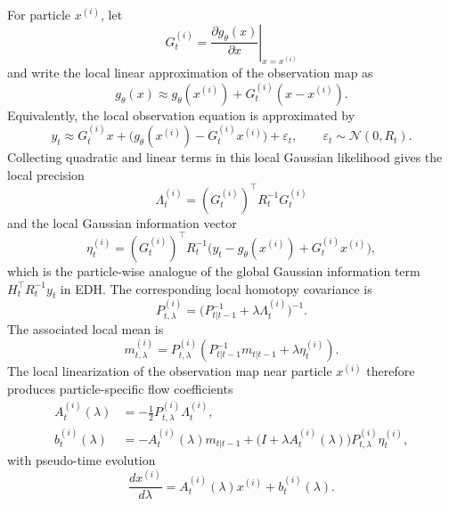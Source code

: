 For particle $x^{(i)}$, let
\begin{equation}
\label{eq:bf-pff-local-jacobian}
  G_t^{(i)} = \left.\frac{\partial g_\theta(x)}{\partial x}\right|_{x=x^{(i)}}
\end{equation}
and write the local linear approximation of the observation map as
\begin{equation}
\label{eq:bf-pff-local-linearization}
  g_\theta(x)
  \approx g_\theta(x^{(i)}) + G_t^{(i)}(x-x^{(i)}).
\end{equation}
Equivalently, the local observation equation is approximated by
\[
  y_t
  \approx
  G_t^{(i)}x
  +
  \bigl(g_\theta(x^{(i)})-G_t^{(i)}x^{(i)}\bigr)
  +
  \varepsilon_t,
  \qquad
  \varepsilon_t\sim\mathcal N(0,R_t).
\]
Collecting quadratic and linear terms in this local Gaussian likelihood gives
the local precision
\begin{equation}
\label{eq:bf-pff-local-precision}
  \Lambda_t^{(i)} = (G_t^{(i)})^\top R_t^{-1} G_t^{(i)}
\end{equation}
and the local Gaussian information vector
\begin{equation}
\label{eq:bf-pff-local-information-vector}
  \eta_t^{(i)}
  = (G_t^{(i)})^\top R_t^{-1}
    \bigl(y_t - g_\theta(x^{(i)}) + G_t^{(i)}x^{(i)}\bigr),
\end{equation}
which is the particle-wise analogue of the global Gaussian information term
$H_t^\top R_t^{-1}y_t$ in EDH.  The corresponding local homotopy covariance is
\begin{equation}
\label{eq:bf-pff-local-homotopy-covariance}
  P_{t,\lambda}^{(i)}
  = \bigl(P_{t|t-1}^{-1} + \lambda \Lambda_t^{(i)}\bigr)^{-1}.
\end{equation}
The associated local mean is
\[
  m_{t,\lambda}^{(i)}
  =
  P_{t,\lambda}^{(i)}
  \left(P_{t|t-1}^{-1}m_{t|t-1}
  +\lambda\eta_t^{(i)}\right).
\]
The local linearization of the observation map near particle $x^{(i)}$ therefore
produces particle-specific flow coefficients
\begin{align}
\label{eq:bf-pff-ledh-A}
  A_t^{(i)}(\lambda)
  &= -\frac{1}{2} P_{t,\lambda}^{(i)} \Lambda_t^{(i)}, \\
\label{eq:bf-pff-ledh-b}
  b_t^{(i)}(\lambda)
  &= -A_t^{(i)}(\lambda)m_{t|t-1}
     + \bigl(I + \lambda A_t^{(i)}(\lambda)\bigr)
       P_{t,\lambda}^{(i)} \eta_t^{(i)},
\end{align}
with pseudo-time evolution
\begin{equation}
\label{eq:bf-pff-ledh-ode}
  \frac{dx^{(i)}}{d\lambda}
  = A_t^{(i)}(\lambda)x^{(i)} + b_t^{(i)}(\lambda).
\end{equation}

